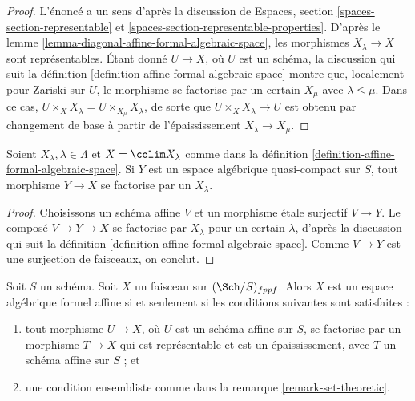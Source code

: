 \begin{proof}
L'énoncé a un sens d'après la discussion de
Espaces, section \ref{spaces-section-representable} et
\ref{spaces-section-representable-properties}.
D'après le lemme \ref{lemma-diagonal-affine-formal-algebraic-space},
les morphismes $X_\lambda \to X$ sont représentables.
Étant donné $U \to X$, où $U$ est un schéma,
la discussion qui suit
la définition \ref{definition-affine-formal-algebraic-space}
montre que, localement pour Zariski sur $U$, le
morphisme se factorise par un certain $X_\mu$ avec $\lambda \leq \mu$.
Dans ce cas, $U \times_X X_\lambda = U \times_{X_\mu} X_\lambda$,
de sorte que $U \times_X X_\lambda \to U$ est obtenu par changement de base à partir de
l'épaississement $X_\lambda \to X_\mu$.
\end{proof}

\begin{lemma}
\label{lemma-factor-through-thickening}
Soient $X_\lambda, \lambda \in \Lambda$ et $X = \colim X_\lambda$
comme dans la définition \ref{definition-affine-formal-algebraic-space}.
Si $Y$ est un espace algébrique quasi-compact sur $S$, tout
morphisme $Y \to X$ se factorise par un $X_\lambda$.
\end{lemma}

\begin{proof}
Choisissons un schéma affine $V$ et un morphisme étale surjectif
$V \to Y$. Le composé $V \to Y \to X$ se factorise par
$X_\lambda$ pour un certain $\lambda$, d'après la discussion qui suit
la définition \ref{definition-affine-formal-algebraic-space}.
Comme $V \to Y$ est une surjection de faisceaux, on conclut.
\end{proof}

\begin{lemma}
\label{lemma-characterize-affine-formal-algebraic-space}
Soit $S$ un schéma. Soit $X$ un faisceau sur $(\Sch/S)_{fppf}$.
Alors $X$ est un espace algébrique formel affine si et seulement si
les conditions suivantes sont satisfaites :
\begin{enumerate}
\item tout morphisme $U \to X$, où $U$ est un schéma affine sur $S$,
se factorise par un morphisme $T \to X$ qui est représentable et est un
épaississement, avec $T$ un schéma affine sur $S$ ; et
\item une condition ensembliste comme dans la remarque \ref{remark-set-theoretic}.
\end{enumerate}
\end{lemma}

